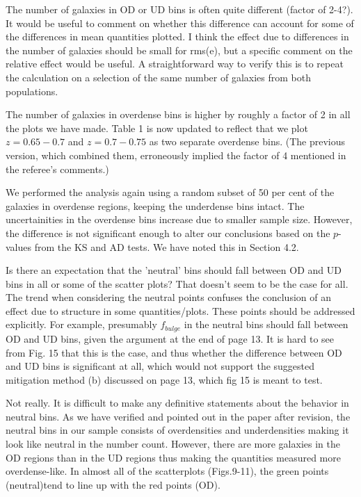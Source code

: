 \documentclass[english]{letter}
\begin{document}
\begin{shaded}
The number of galaxies in OD or UD bins is often quite different (factor of 2-4?). It would be useful to comment on whether this difference can account for some of the differences in mean quantities plotted. I think the effect due to differences in the number of galaxies should be small for rms(e), but a specific comment on the relative effect would be useful. A straightforward way to verify this is to repeat the calculation on a selection of the same number of galaxies from both populations.
\end{shaded}
\noindent 
The number of
galaxies in overdense bins is higher by roughly a factor of 2 in all the plots we have made. Table 1
is now updated to reflect that we plot $z=0.65-0.7$ and $z=0.7-0.75$ as two separate overdense bins.
(The previous version, which combined them, erroneously implied the factor of 4 mentioned in the
referee's comments.)

We performed the analysis again using a random subset of 50 per cent of the galaxies in overdense
regions, keeping the underdense bins intact. The uncertainities in the overdense bins increase due
to smaller sample size. However, the difference is not significant enough to alter our conclusions
based on the $p$-values from the KS and AD tests. We have noted this in Section 4.2.

\begin{shaded}
Is there an expectation that the 'neutral' bins should fall between OD and UD bins in all or some of the scatter plots? That doesn't seem to be the case for all. The trend when considering the neutral points confuses the conclusion of an effect due to structure in some quantities/plots. These points should be addressed explicitly. For example, presumably $f_{bulge}$ in the neutral bins should fall between OD and UD bins, given the argument at the end of page 13. It is hard to see from Fig. 15 that this is the case, and thus whether the difference between OD and UD bins is significant at all, which would not support the suggested mitigation method (b) discussed on page 13, which fig 15 is meant to test.
\end{shaded}

Not really. It is difficult to make any definitive statements about the behavior in neutral bins. As we have verified and pointed out in the paper after revision,
the neutral bins in our sample consists of overdensities and underdensities making it look like neutral in the number count. However, there are more galaxies in the OD regions than in the UD regions thus making the quantities measured more overdense-like. In almost all of the scatterplots (Figs.9-11), the green points (neutral)tend to line up with the red points (OD). 
\end{document}
